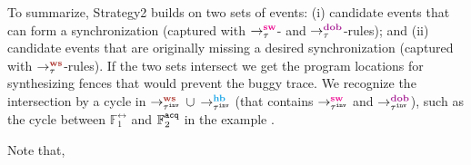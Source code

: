 To summarize, Strategy2 builds on two sets of events:
(i) candidate events that can form a synchronization 
(captured with $\setSW$- and $\setDOB$-rules); and
(ii) candidate events that are originally missing a desired
synchronization (captured with $\setWS$-rules).
If the two sets intersect we get the program locations
for synthesizing fences that would prevent the buggy trace.
We recognize the intersection by a cycle in  
$\ws{\inv{\tau}}{}{}$ $\cup$ $\hb{\inv{\tau}}{}{}$ 
(that contains $\sw{\inv{\tau}}{}{}$ and $\dob{\inv{\tau}}{}{}$), 
such as the cycle between $\mathbb{F}^\rel_1$ and 
$\mathbb{F}^\texttt{acq}_2$ in the example .

Note that, 
